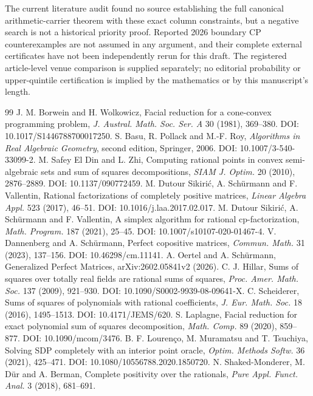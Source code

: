 The current literature audit found no source establishing the full canonical arithmetic-carrier theorem with these exact column constraints, but a negative search is not a historical priority proof. Reported 2026 boundary CP counterexamples are not assumed in any argument, and their complete external certificates have not been independently rerun for this draft. The registered article-level venue comparison is supplied separately; no editorial probability or upper-quintile certification is implied by the mathematics or by this manuscript's length.

\begin{thebibliography}{99}
 J. M. Borwein and H. Wolkowicz, Facial reduction for a cone-convex programming problem, \emph{J. Austral. Math. Soc. Ser. A} 30 (1981), 369--380. DOI: 10.1017/S1446788700017250.
 S. Basu, R. Pollack and M.-F. Roy, \emph{Algorithms in Real Algebraic Geometry}, second edition, Springer, 2006. DOI: 10.1007/3-540-33099-2.
 M. Safey El Din and L. Zhi, Computing rational points in convex semi-algebraic sets and sum of squares decompositions, \emph{SIAM J. Optim.} 20 (2010), 2876--2889. DOI: 10.1137/090772459.
 M. Dutour Sikiri\'c, A. Sch\"urmann and F. Vallentin, Rational factorizations of completely positive matrices, \emph{Linear Algebra Appl.} 523 (2017), 46--51. DOI: 10.1016/j.laa.2017.02.017.
 M. Dutour Sikiri\'c, A. Sch\"urmann and F. Vallentin, A simplex algorithm for rational cp-factorization, \emph{Math. Program.} 187 (2021), 25--45. DOI: 10.1007/s10107-020-01467-4.
 V. Dannenberg and A. Sch\"urmann, Perfect copositive matrices, \emph{Commun. Math.} 31 (2023), 137--156. DOI: 10.46298/cm.11141.
 A. Oertel and A. Sch\"urmann, Generalized Perfect Matrices, arXiv:2602.05841v2 (2026).
 C. J. Hillar, Sums of squares over totally real fields are rational sums of squares, \emph{Proc. Amer. Math. Soc.} 137 (2009), 921--930. DOI: 10.1090/S0002-9939-08-09641-X.
 C. Scheiderer, Sums of squares of polynomials with rational coefficients, \emph{J. Eur. Math. Soc.} 18 (2016), 1495--1513. DOI: 10.4171/JEMS/620.
 S. Laplagne, Facial reduction for exact polynomial sum of squares decomposition, \emph{Math. Comp.} 89 (2020), 859--877. DOI: 10.1090/mcom/3476.
 B. F. Louren\c co, M. Muramatsu and T. Tsuchiya, Solving SDP completely with an interior point oracle, \emph{Optim. Methods Softw.} 36 (2021), 425--471. DOI: 10.1080/10556788.2020.1850720.
 N. Shaked-Monderer, M. D\"ur and A. Berman, Complete positivity over the rationals, \emph{Pure Appl. Funct. Anal.} 3 (2018), 681--691.

\end{thebibliography}
